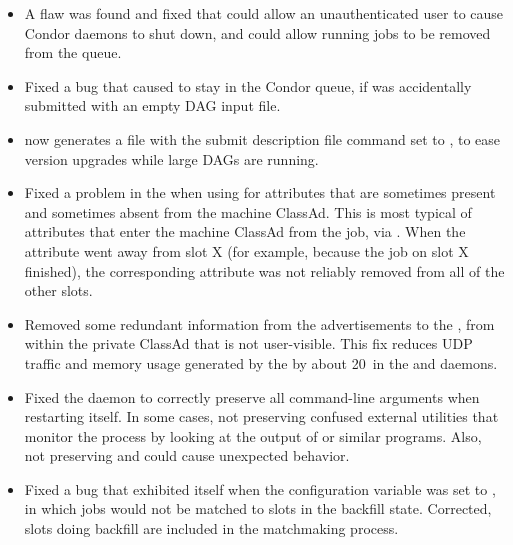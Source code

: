 \begin{itemize}

\item \Security A flaw was found and fixed that could allow an unauthenticated
user to cause Condor daemons to shut down,
and could allow running jobs to be removed from the queue.

\item Fixed a bug that caused  to stay in the Condor
queue, if  was accidentally submitted with an empty DAG
input file.

\item {} now generates a  file with
the submit description file command 
set to , to ease version upgrades while
large DAGs are running.

\item Fixed a problem in the  when using
 for attributes that are sometimes
present and sometimes absent from the machine ClassAd.  This is most
typical of attributes that enter the machine ClassAd from the job, via
.  When the attribute went away from slot X
(for example, because the job on slot X finished), the corresponding
 attribute was not reliably removed from
all of the other slots.

\item Removed some redundant information from the  
advertisements to the , 
from within the private ClassAd that is not user-visible.
This fix reduces UDP traffic and memory usage generated by
the  by about 20\Percent\
in the  and  daemons.

\item Fixed the  daemon to correctly preserve all command-line
arguments when restarting itself.  In some cases, not preserving 
confused external utilities that monitor the \Condor{master} process by looking
at the output of \Prog{ps} or similar programs.  Also, not preserving
\Opt{-pid} and \Opt{-runfor} could cause unexpected behavior.

\item Fixed a bug that exhibited itself when
the configuration variable 
was set to \Expr{False}, in which jobs
would not be matched to slots in the backfill state.  Corrected, slots doing
backfill are included in the matchmaking process.


\end{itemize}

